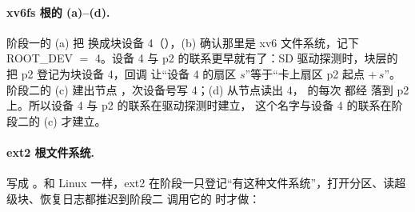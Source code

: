 \paragraph{xv6fs 根的 (a)--(d).} 阶段一的 (a) 把  换成块设备 4（），(b)  确认那里是 xv6 文件系统，记下 ROOT\_DEV $=$ 4。设备 4 与 p2 的联系更早就有了：SD 驱动探测时，块层的  把 p2 登记为块设备 4，回调  让“设备 4 的扇区 $s$”等于“卡上扇区 p2 起点 $+\,s$”。阶段二的 (c) 建出节点 ，次设备号写 4；(d)  从节点读出 4， 的每次  都经  落到 p2 上。所以设备 4 与 p2 的联系在驱动探测时建立， 这个名字与设备 4 的联系在阶段二的 (c) 才建立。

\paragraph{ext2 根文件系统.}  写成 。和 Linux 一样，ext2 在阶段一只登记“有这种文件系统”，打开分区、读超级块、恢复日志都推迟到阶段二  调用它的  时才做：

